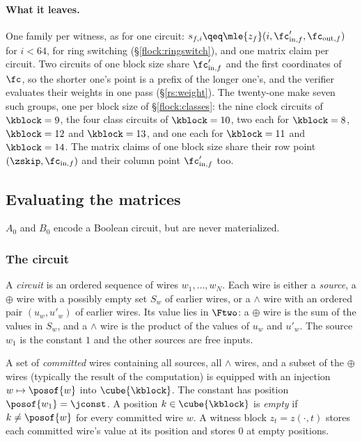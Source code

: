 \paragraph{What it leaves.} One family per witness, as for one circuit: $s_{f,i}\qeq\mle{z_f}(i,\fc'_{\mathrm{in},f},\fc_{\mathrm{out},f})$ for $i<64$, for ring switching (\S\ref{flock:ringswitch}), and one matrix claim per circuit. Two circuits of one block size share $\fc'_{\mathrm{in},f}$ and the first coordinates of $\fc$, so the shorter one's point is a prefix of the longer one's, and the verifier evaluates their weights in one pass (\S\ref{rs:weight}). The twenty-one make seven such groups, one per block size of \S\ref{flock:classes}: the nine clock circuits of $\kblock=9$, the four class circuits of $\kblock=10$, two each for $\kblock=8$, $\kblock=12$ and $\kblock=13$, and one each for $\kblock=11$ and $\kblock=14$. The matrix claims of one block size share their row point $(\zskip,\fc_{\mathrm{in},f})$ and their column point $\fc'_{\mathrm{in},f}$ too.

\subsection{Evaluating the matrices}\label{flock:matrices}

$A_0$ and $B_0$ encode a Boolean circuit, but are never materialized.

\subsubsection{The circuit}\label{flock:circuit}

\begin{definition}[Circuit]\label{def:circuit}
A \emph{circuit} is an ordered sequence of wires $w_1,\ldots,w_N$. Each wire is either a \emph{source}, a $\oplus$ wire with a possibly empty set $S_w$ of earlier wires, or a $\wedge$ wire with an ordered pair $(u_w,u'_w)$ of earlier wires. Its value lies in $\Ftwo$: a $\oplus$ wire is the sum of the values in $S_w$, and a $\wedge$ wire is the product of the values of $u_w$ and $u'_w$. The source $w_1$ is the constant $1$ and the other sources are free inputs.

A set of \emph{committed} wires containing all sources, all $\wedge$ wires, and a subset of the $\oplus$ wires (typically the result of the computation) is equipped with an injection $w\mapsto\posof{w}$ into $\cube{\kblock}$. The constant has position $\posof{w_1}=\jconst$. A position $k\in\cube{\kblock}$ is \emph{empty} if $k\neq\posof{w}$ for every committed wire $w$. A witness block $z_t=z(\cdot,t)$ stores each committed wire's value at its position and stores $0$ at empty positions.
\end{definition}

